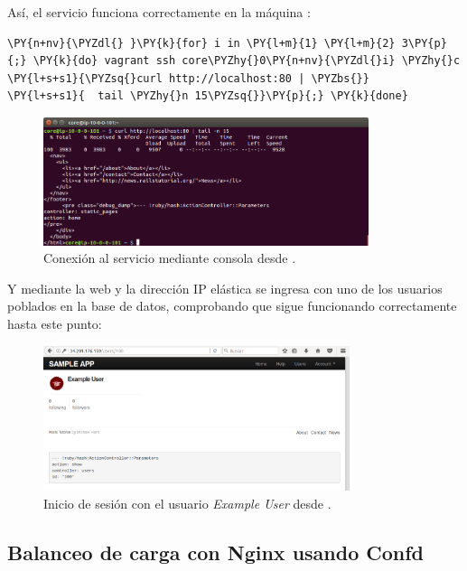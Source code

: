 Así, el servicio funciona correctamente en la máquina :
\begin{framed_shaded}
\begin{Verbatim}[fontsize=\relsize{-2.5},fontseries=b,commandchars=\\\{\}]
\PY{n+nv}{\PYZdl{} }\PY{k}{for} i in \PY{l+m}{1} \PY{l+m}{2} 3\PY{p}{;} \PY{k}{do} vagrant ssh core\PYZhy{}0\PY{n+nv}{\PYZdl{}i} \PYZhy{}c \PY{l+s+s1}{\PYZsq{}curl http://localhost:80 | \PYZbs{}}
\PY{l+s+s1}{  tail \PYZhy{}n 15\PYZsq{}}\PY{p}{;} \PY{k}{done}
\end{Verbatim}
\end{framed_shaded}

\begin{figure}[H]
\centering
\includegraphics[width=0.85\textwidth]{images/figures/skydns-curl.png}
\caption{Conexión al servicio mediante consola desde .}
\end{figure}

Y mediante la web y la dirección IP elástica se ingresa con uno de los usuarios poblados en la base de datos, comprobando que sigue funcionando correctamente hasta este punto:

\begin{figure}[H]
\centering
\includegraphics[width=0.8\textwidth]{images/figures/skydns-web.png}
\caption{Inicio de sesión con el usuario \textit{Example User} desde .}
\end{figure}

\subsection{Balanceo de carga con Nginx usando Confd}

